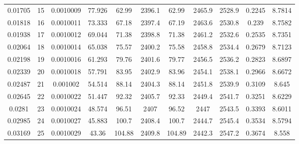 \begin{longtable}{ccccccccccc}
0.01705  & 15          & 0.0010009              & 77.926              & 62.99                  & 2396.1              & 62.99           & 2465.9       & 2528.9       & 0.2245         & 8.7814      \\
0.01818  & 16          & 0.0010011              & 73.333              & 67.18                  & 2397.4              & 67.19           & 2463.6       & 2530.8       & 0.239          & 8.7582      \\
0.01938  & 17          & 0.0010012              & 69.044              & 71.38                  & 2398.8              & 71.38           & 2461.2       & 2532.6       & 0.2535         & 8.7351      \\
0.02064  & 18          & 0.0010014              & 65.038              & 75.57                  & 2400.2              & 75.58           & 2458.8       & 2534.4       & 0.2679         & 8.7123      \\
0.02198  & 19          & 0.0010016              & 61.293              & 79.76                  & 2401.6              & 79.77           & 2456.5       & 2536.2       & 0.2823         & 8.6897      \\
0.02339  & 20          & 0.0010018              & 57.791              & 83.95                  & 2402.9              & 83.96           & 2454.1       & 2538.1       & 0.2966         & 8.6672      \\
0.02487  & 21          & 0.001002               & 54.514              & 88.14                  & 2404.3              & 88.14           & 2451.8       & 2539.9       & 0.3109         & 8.645       \\
0.02645  & 22          & 0.0010022              & 51.447              & 92.32                  & 2405.7              & 92.33           & 2449.4       & 2541.7       & 0.3251         & 8.6229      \\
0.0281   & 23          & 0.0010024              & 48.574              & 96.51                  & 2407                & 96.52           & 2447         & 2543.5       & 0.3393         & 8.6011      \\
0.02985  & 24          & 0.0010027              & 45.883              & 100.7                  & 2408.4              & 100.7           & 2444.7       & 2545.4       & 0.3534         & 8.5794      \\
0.03169  & 25          & 0.0010029              & 43.36               & 104.88                 & 2409.8              & 104.89          & 2442.3       & 2547.2       & 0.3674         & 8.558       \\

\end{longtable}
